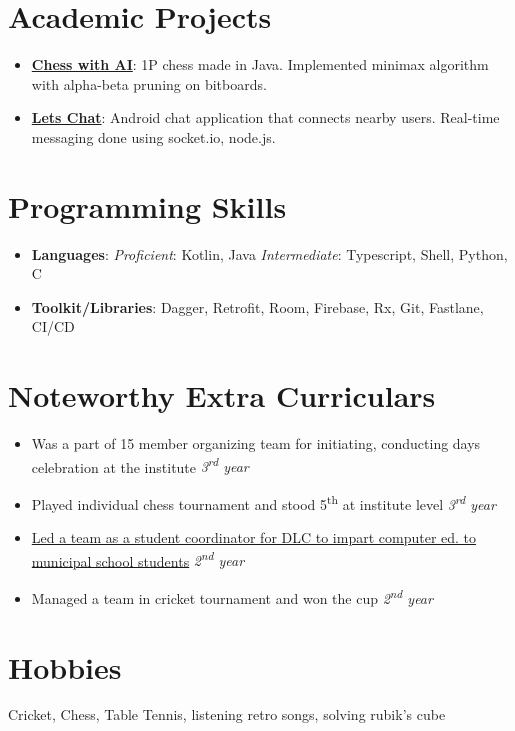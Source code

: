 \documentclass[letterpaper,11pt]{article}
\newcommand{\resumeItem}[2]{
  \item\small{
    \textbf{#1}{: #2 \vspace{-2pt}}
  }
}
\newcommand{\resumeItemTwo}[2]{
  \item {
    #1 \hfill \textit{\small #2}
    \vspace{-5pt}
  }
}
\newcommand{\resumeSubItem}[2]{\resumeItem{#1}{#2}\vspace{-4pt}}
\newcommand{\resumeSubHeadingListStart}{\begin{itemize}[leftmargin=*]}
\newcommand{\resumeSubHeadingListEnd}{\end{itemize}}
\begin{document}
	
\section{Academic Projects}
  \resumeSubHeadingListStart
    \resumeSubItem{\href{https://github.com/JainamJhaveri/Chess}{Chess with AI}}
	{1P chess made in Java. Implemented minimax algorithm with alpha-beta pruning on bitboards.}
    \resumeSubItem {\href {https://github.com/JainamJhaveri/LetsChat} {Lets Chat}}
	{Android chat application that connects nearby users. Real-time messaging done using socket.io, node.js.}
  \resumeSubHeadingListEnd


\section{Programming Skills}
  \resumeSubHeadingListStart
    \resumeSubItem{Languages}{
      {\textit{\small Proficient}}: Kotlin, Java
      {\textit{\small Intermediate}}: Typescript, Shell, Python, C}
    \resumeSubItem {Toolkit/Libraries}
		{Dagger, Retrofit, Room, Firebase, Rx, Git, Fastlane, CI/CD}
  \resumeSubHeadingListEnd

		
\section{Noteworthy Extra Curriculars}
  \resumeSubHeadingListStart
	    \resumeItemTwo{Was a part of 15 member organizing team for initiating, conducting days celebration at the institute} {3\textsuperscript{rd} year}
		\resumeItemTwo{Played individual chess tournament and stood 5\textsuperscript{th} at institute level} {3\textsuperscript{rd} year}
		\resumeItemTwo{\href{http://yuvadlccampaign.blogspot.com/}{Led a team as a student coordinator for DLC to impart computer ed. to municipal school students}} {2\textsuperscript{nd} year}
	    \resumeItemTwo{Managed a team in cricket tournament and won the cup} {2\textsuperscript{nd} year}
  \resumeSubHeadingListEnd

\section{Hobbies}
Cricket, Chess, Table Tennis, listening retro songs, solving rubik's cube

\end{document}
